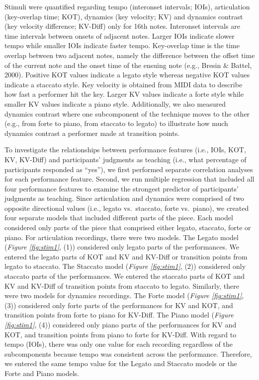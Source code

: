 \documentclass[
  man,floatsintext]{apa6}
\begin{document}
Stimuli were quantified regarding tempo (interonset intervals; IOIs), articulation (key-overlap time; KOT), dynamics (key velocity; KV) and dynamics contrast (key velocity difference; KV-Diff) only for 16th notes. Interonset intervals are time intervals between onsets of adjacent notes. Larger IOIs indicate slower tempo while smaller IOIs indicate faster tempo. Key-overlap time is the time overlap between two adjacent notes, namely the difference between the offset time of the current note and the onset time of the ensuing note (e.g., Bresin \& Battel, 2000). Positive KOT values indicate a legato style whereas negative KOT values indicate a staccato style. Key velocity is obtained from MIDI data to describe how fast a performer hit the key. Larger KV values indicate a forte style while smaller KV values indicate a piano style. Additionally, we also measured dynamics contrast where one subcomponent of the technique moves to the other (e.g., from forte to piano, from staccato to legato) to illustrate how much dynamics contrast a performer made at transition points.

To investigate the relationships between performance features (i.e., IOIs, KOT, KV, KV-Diff) and participants' judgments as teaching (i.e., what percentage of participants responded as ``yes''), we first performed separate correlation analyses for each performance feature. Second, we run multiple regression that included all four performance features to examine the strongest predictor of participants' judgments as teaching. Since articulation and dynamics were comprised of two opposite directional values (i.e., legato vs.~staccato, forte vs.~piano), we created four separate models that included different parts of the piece. Each model considered only parts of the piece that comprised either legato, staccato, forte or piano. For articulation recordings, there were two models. The Legato model (\emph{Figure \ref{fig:stim1}}, (1)) considered only legato parts of the performances. We entered the legato parts of KOT and KV and KV-Diff or transition points from legato to staccato. The Staccato model (\emph{Figure \ref{fig:stim1}}, (2)) considered only staccato parts of the performances. We entered the staccato parts of KOT and KV and KV-Diff of transition points from staccato to legato. Similarly, there were two models for dynamics recordings. The Forte model (\emph{Figure \ref{fig:stim1}}, (3)) considered only forte parts of the performances for KV and KOT, and transition points from forte to piano for KV-Diff. The Piano model (\emph{Figure \ref{fig:stim1}}, (4)) considered only piano parts of the performances for KV and KOT, and transition points from piano to forte for KV-Diff. With regard to tempo (IOIs), there was only one value for each recording regardless of the subcomponents because tempo was consistent across the performance. Therefore, we entered the same tempo value for the Legato and Staccato models or the Forte and Piano models.
\end{document}

